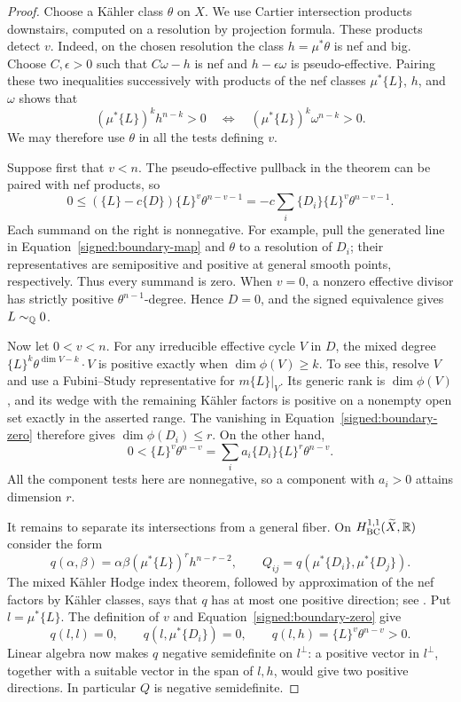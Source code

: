 \begin{proof}
Choose a Kähler class \(\theta\) on \(X\).  We use Cartier
intersection products downstairs, computed on a resolution by
projection formula.  These products detect \(v\).  Indeed, on the
chosen resolution the class \(h=\mu^*\theta\) is nef and big.
Choose \(C,\epsilon>0\) such that
\(C\omega-h\) is nef and \(h-\epsilon\omega\) is
pseudo-effective.  Pairing these two inequalities successively with
products of the nef classes \(\mu^*\{L\}\), \(h\), and
\(\omega\) shows that
\[
 (\mu^*\{L\})^k h^{n-k}>0
 \quad\Longleftrightarrow\quad
 (\mu^*\{L\})^k\omega^{n-k}>0.
\]
We may therefore use \(\theta\) in all the tests defining \(v\).

Suppose first that \(v<n\).  The pseudo-effective pullback in the
theorem can be paired with nef products, so
\begin{equation}\label{signed:boundary-zero}
 0\leq (\{L\}-c\{D\})\{L\}^{v}\theta^{n-v-1}
   =-c\sum_i\{D_i\}\{L\}^{v}\theta^{n-v-1}.
\end{equation}
Each summand on the right is nonnegative.  For example, pull the
generated line in Equation~\eqref{signed:boundary-map} and
\(\theta\) to a resolution of \(D_i\); their representatives are
semipositive and positive at general smooth points, respectively.
Thus every summand is zero.  When \(v=0\), a nonzero effective
divisor has strictly positive \(\theta^{n-1}\)-degree.  Hence
\(D=0\), and the signed equivalence gives \(L\sim_{\mathbb Q}0\).

Now let \(0<v<n\).  For any irreducible effective cycle \(V\) in
\(D\), the mixed degree
\(\{L\}^k\theta^{\dim V-k}\cdot V\) is positive exactly when
\(\dim\phi(V)\geq k\).  To see this, resolve \(V\) and use a
Fubini--Study representative for \(m\{L\}|_V\).  Its generic rank
is \(\dim\phi(V)\), and its wedge with the remaining Kähler
factors is positive on a nonempty open set exactly in the asserted
range.  The vanishing in Equation~\eqref{signed:boundary-zero}
therefore gives \(\dim\phi(D_i)\leq r\).  On the other hand,
\begin{equation}\label{signed:positive-attainment}
 0<\{L\}^{v}\theta^{n-v}
   =\sum_i a_i\{D_i\}\{L\}^{r}\theta^{n-v}.
\end{equation}
All the component tests here are nonnegative, so a component with
\(a_i>0\) attains dimension \(r\).

It remains to separate its intersections from a general fiber.
On \(H^{1,1}_{\mathrm{BC}}(\widetilde X,\mathbb R)\) consider the form
\[
 q(\alpha,\beta)=
 \alpha\beta(\mu^*\{L\})^r h^{n-r-2},\qquad
 Q_{ij}=q(\mu^*\{D_i\},\mu^*\{D_j\}).
\]
The mixed Kähler Hodge index theorem, followed by approximation of
the nef factors by Kähler classes, says that \(q\) has at most one
positive direction; see \cite[Theorems~A and C]{DinhNguyen}.  Put
\(l=\mu^*\{L\}\).  The definition of \(v\) and
Equation~\eqref{signed:boundary-zero} give
\[
 q(l,l)=0,\qquad q(l,\mu^*\{D_i\})=0,
 \qquad q(l,h)=\{L\}^{v}\theta^{n-v}>0.
\]
Linear algebra now makes \(q\) negative semidefinite on
\(l^\perp\): a positive vector in \(l^\perp\), together with a
suitable vector in the span of \(l,h\), would give two positive
directions.  In particular \(Q\) is negative semidefinite.


\end{proof}
